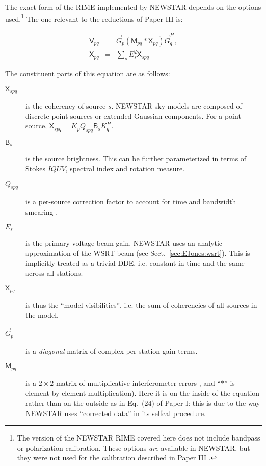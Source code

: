 \documentclass{aa}
\newcommand{\herm}{H}
\newcommand{\jones}[2]{\vec {#1}_{#2}}
\newcommand{\jonesT}[2]{\vec {#1}^{\herm}_{#2}}
\newcommand{\coh}[2]{\mathsf{{#1}}_{{#2}}}
\begin{document}
The exact form of the RIME implemented by NEWSTAR depends on the options used.\footnote{The version of the NEWSTAR RIME covered here does not include bandpass or polarization calibration. These options \emph{are} available in NEWSTAR, but they were not used for the calibration described in Paper III \citep{RRIME3}.} The one relevant to the reductions of Paper III is:

\begin{eqnarray}\label{eq:newstar-rime}
\coh{V}{pq} & = & \jones{G}{p} \left ( \coh{M}{pq} \ast \coh{X}{pq} \right ) \jonesT{G}{q}, \\
\nonumber \coh{X}{pq} & = & \sum_{s} E^2_s \coh{X}{spq} 
\end{eqnarray}

The constituent parts of this equation are as follows:
\begin{description}
\item[$\coh{X}{spq}$] is the coherency of source $s$. NEWSTAR sky models are composed of discrete point sources or extended Gaussian components. For a point source, $\coh{X}{spq} = K_p Q_{spq} \coh{B}{s} K^\herm_q$.

\item[$\coh{B}{s}$] is the source brightness. This can be further parameterized in terms of Stokes $IQUV$, spectral index and rotation measure.

\item[$Q_{spq}$] is a per-source correction factor to account for time and bandwidth smearing \citep[see Paper I,][Sect.~5.2]{RRIME1}.

\item[$E_s$] is the primary voltage beam gain. NEWSTAR uses an analytic approximation of the WSRT beam (see Sect.~\ref{sec:EJones:wsrt}). This is implicitly treated as a trivial DDE, i.e. constant in time and the same across all stations.

\item[$\coh{X}{pq}$] is thus the ``model visibilities'', i.e. the sum of coherencies of all sources in the model.

\item[$\jones{G}{p}$] is a {\em diagonal} matrix of complex per-station gain terms.

\item[$\coh{M}{pq}$] is a $2\times2$ matrix of multiplicative interferometer errors \citep[see Paper I,][Sect.~5.3]{RRIME1}, and ``$\ast$'' is element-by-element multiplication). Here it is on the inside of the equation rather than on the outside as in Eq.~(24) of Paper I: this is due to the way NEWSTAR uses ``corrected data'' in its selfcal procedure.%

\end{description}
\end{document}
